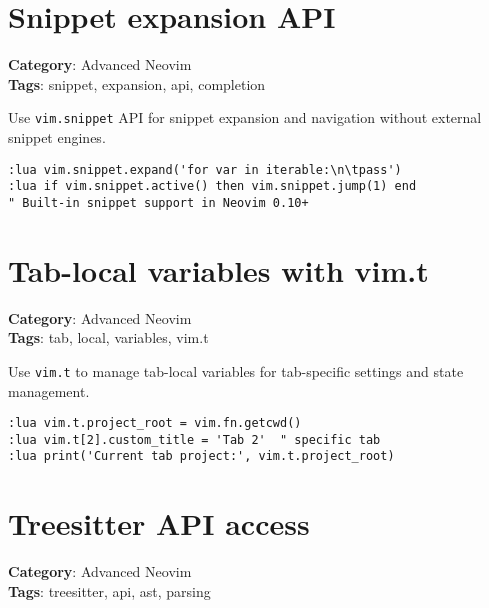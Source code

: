 \section{Snippet expansion API}

\textbf{Category}: Advanced Neovim\\ \textbf{Tags}: snippet, expansion, api, completion
\vspace{0.5cm}

Use {\footnotesize \Verb§vim.snippet§} API for snippet expansion and navigation without external snippet engines.

\begin{Exa*}{}
\begin{Verbatim}[fontsize=\footnotesize, breaklines, breakanywhere]
:lua vim.snippet.expand('for var in iterable:\n\tpass')
:lua if vim.snippet.active() then vim.snippet.jump(1) end
" Built-in snippet support in Neovim 0.10+
\end{Verbatim}
\end{Exa*}

\section{Tab-local variables with vim.t}

\textbf{Category}: Advanced Neovim\\ \textbf{Tags}: tab, local, variables, vim.t
\vspace{0.5cm}

Use {\footnotesize \Verb§vim.t§} to manage tab-local variables for tab-specific settings and state management.

\begin{Exa*}{}
\begin{Verbatim}[fontsize=\footnotesize, breaklines, breakanywhere]
:lua vim.t.project_root = vim.fn.getcwd()
:lua vim.t[2].custom_title = 'Tab 2'  " specific tab
:lua print('Current tab project:', vim.t.project_root)
\end{Verbatim}
\end{Exa*}

\section{Treesitter API access}

\textbf{Category}: Advanced Neovim\\ \textbf{Tags}: treesitter, api, ast, parsing
\vspace{0.5cm}

